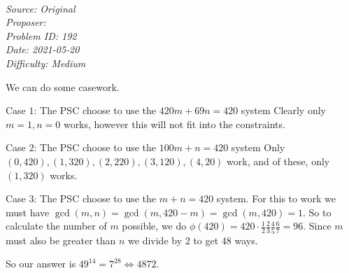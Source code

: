 \SSbreak\\
\emph{Source: Original}\\
\emph{Proposer: \Ppi}\\ %
\emph{Problem ID: 192}\\
\emph{Date: 2021-05-20}\\
\emph{Difficulty: Medium}\\
\SSbreak

\bigskip

\begin{solution}\hfil\medskip
	
    We can do some casework.

Case $1$: The PSC choose to use the $420m+69n = 420$ system
Clearly only $m=1, n=0$ works, however this will not fit into the constraints. \medskip

Case $2$: The PSC choose to use the $100m+n = 420$ system
Only $(0,420), (1,320), (2,220), (3,120), (4,20)$ work, and of these, only $(1, 320)$ works. \medskip

Case $3$: The PSC choose to use the $m+n=420$ system. 
For this to work we must have $\gcd(m, n) = \gcd(m, 420-m) = \gcd(m, 420) = 1$. So to calculate the number of $m$ possible, we do $\phi(420) = 420 \cdot \frac{1}{2} \frac{2}{3} \frac{4}{5} \frac{6}{7} = 96$. Since $m$ must also be greater than $n$ we divide by $2$ to get $48$ ways. \medskip

So our answer is $49^{14} = 7^{28} \iff \boxed{4872}.$
\end{solution}\bigskip
